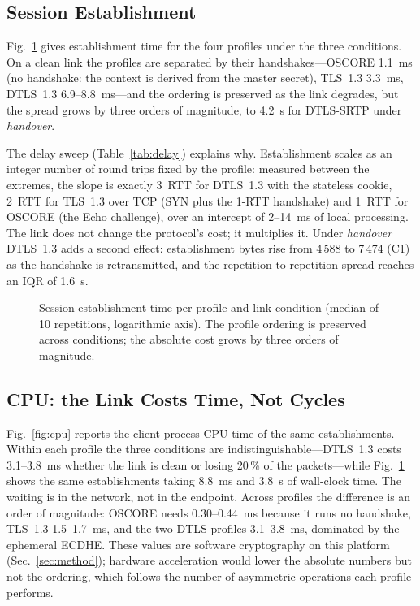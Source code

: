\documentclass[conference]{IEEEtran}
\begin{document}


\subsection{Session Establishment}
Fig.~\ref{fig:latency} gives establishment time for the four profiles under
the three conditions. On a clean link the profiles are separated by their
handshakes---OSCORE \SI{1.1}{\milli\second} (no handshake: the context is
derived from the master secret), TLS~1.3 \SI{3.3}{\milli\second}, DTLS~1.3
\SI{6.9}{}--\SI{8.8}{\milli\second}---and the ordering is preserved as the
link degrades, but the spread grows by three orders of magnitude, to
\SI{4.2}{\second} for DTLS-SRTP under \emph{handover}.

The delay sweep (Table~\ref{tab:delay}) explains why. Establishment scales as
an integer number of round trips fixed by the profile: measured between the
extremes, the slope is exactly 3~RTT for DTLS~1.3 with the stateless cookie,
2~RTT for TLS~1.3 over TCP (SYN plus the 1-RTT handshake) and 1~RTT for
OSCORE (the Echo challenge), over an intercept of 2--14~ms of local
processing. The link does not change the protocol's cost; it multiplies it.
Under \emph{handover} DTLS~1.3 adds a second effect: establishment bytes rise
from 4\,588 to 7\,474 (C1) as the handshake is retransmitted, and the
repetition-to-repetition spread reaches an IQR of \SI{1.6}{\second}.

\begin{figure}[t]
\centering

\caption{Session establishment time per profile and link condition (median of
10 repetitions, logarithmic axis). The profile ordering is preserved across
conditions; the absolute cost grows by three orders of magnitude.}
\label{fig:latency}
\end{figure}



\subsection{CPU: the Link Costs Time, Not Cycles}
Fig.~\ref{fig:cpu} reports the client-process CPU time of the same
establishments. Within each profile the three conditions are
indistinguishable---DTLS~1.3 costs 3.1--3.8~ms whether the link is clean or
losing 20\,\% of the packets---while Fig.~\ref{fig:latency} shows the same
establishments taking 8.8~ms and 3.8~s of wall-clock time. The waiting is in
the network, not in the endpoint. Across profiles the difference is an order
of magnitude: OSCORE needs 0.30--0.44~ms because it runs no handshake, TLS~1.3
1.5--1.7~ms, and the two DTLS profiles 3.1--3.8~ms, dominated by the ephemeral
ECDHE. These values are software cryptography on this platform
(Sec.~\ref{sec:method}); hardware acceleration would lower the absolute
numbers but not the ordering, which follows the number of asymmetric
operations each profile performs.
\end{document}
